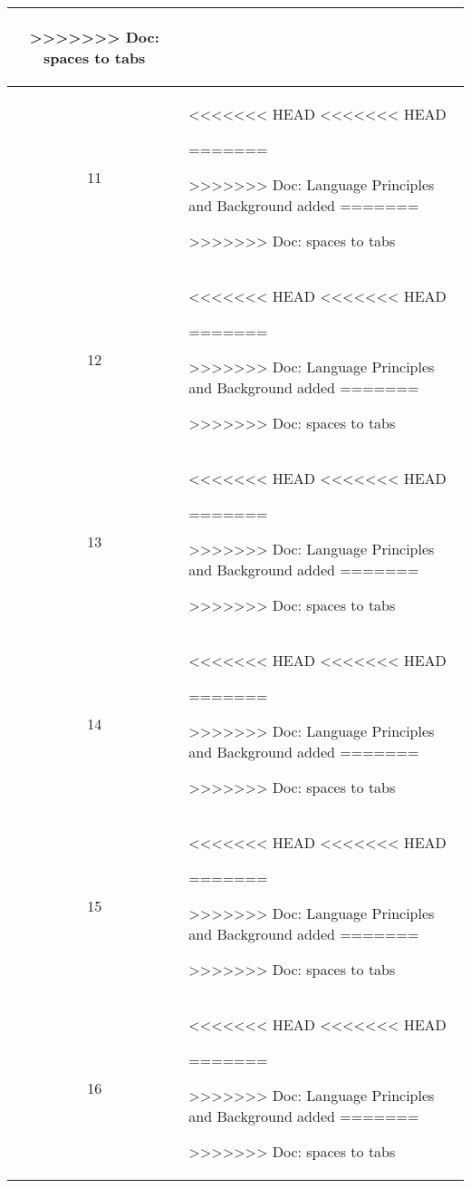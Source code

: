 \begin{center}
\begin{longtable}{|c|p{12cm}|}
\begin{journal}
>>>>>>> Doc: spaces to tabs
\end{journal}
\\ \hline
11 & 
\begin{journal}
<<<<<<< HEAD
<<<<<<< HEAD
	\item 
=======
  \item 
>>>>>>> Doc: Language Principles and Background added
=======
	\item 
>>>>>>> Doc: spaces to tabs
\end{journal}
\\ \hline
12 & 
\begin{journal}
<<<<<<< HEAD
<<<<<<< HEAD
	\item 
=======
  \item 
>>>>>>> Doc: Language Principles and Background added
=======
	\item 
>>>>>>> Doc: spaces to tabs
\end{journal}
\\ \hline
13 & 
\begin{journal}
<<<<<<< HEAD
<<<<<<< HEAD
	\item 
=======
  \item 
>>>>>>> Doc: Language Principles and Background added
=======
	\item 
>>>>>>> Doc: spaces to tabs
\end{journal}
\\ \hline
14 & 
\begin{journal}
<<<<<<< HEAD
<<<<<<< HEAD
	\item 
=======
  \item 
>>>>>>> Doc: Language Principles and Background added
=======
	\item 
>>>>>>> Doc: spaces to tabs
\end{journal}
\\ \hline
15 & 
\begin{journal}
<<<<<<< HEAD
<<<<<<< HEAD
	\item 
=======
  \item 
>>>>>>> Doc: Language Principles and Background added
=======
	\item 
>>>>>>> Doc: spaces to tabs
\end{journal}
\\ \hline
16 & 
\begin{journal}
<<<<<<< HEAD
<<<<<<< HEAD
	\item 
=======
  \item 
>>>>>>> Doc: Language Principles and Background added
=======
	\item 
>>>>>>> Doc: spaces to tabs
\end{journal}
\\ \hline
\end{longtable}
\end{center}
